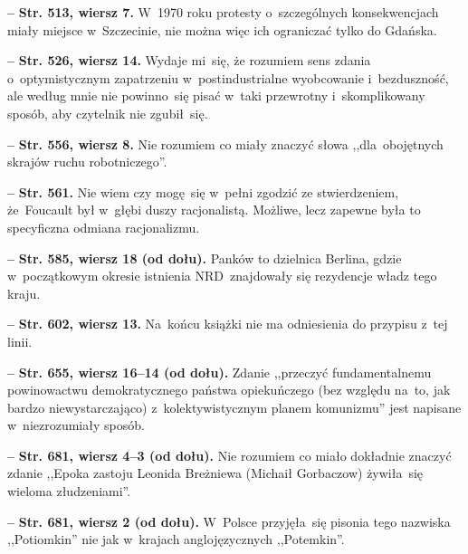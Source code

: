 \documentclass[a4paper,11pt]{article}  %
\newcommand{\spaceFour}{0.5em}
\newcommand{\tb}{\textbf}
\newcommand{\noi}{\noindent}
\newcommand{\start}{\noi \tb{--} {}}
\newcommand{\Str}[1]{\tb{Str. #1.}}
\newcommand{\StrWg}[2]{\tb{Str. #1, wiersz #2.}}
\newcommand{\StrWd}[2]{\tb{Str. #1, wiersz #2 (od dołu).}}
\begin{document}
\vspace{\spaceFour}


\start \StrWg{513}{7} W~1970 roku protesty o~szczególnych
konsekwencjach miały miejsce w~Szczecinie, nie można więc ich
ograniczać tylko do Gdańska.

\vspace{\spaceFour}


\start \StrWg{526}{14} Wydaje mi~się, że rozumiem sens zdania
o~optymistycznym zapatrzeniu w~postindustrialne wyobcowanie
i~bezduszność, ale według mnie nie powinno~się pisać w~taki przewrotny
i~skomplikowany sposób, aby czytelnik nie zgubił~się.

\vspace{\spaceFour}


\start \StrWg{556}{8} Nie rozumiem co miały znaczyć słowa
,,dla~obojętnych skrajów ruchu robotniczego''.

\vspace{\spaceFour}


\start \Str{561} Nie wiem czy mogę~się w~pełni zgodzić ze
stwierdzeniem, że~Foucault był w~głębi duszy racjonalistą. Możliwe,
lecz zapewne była to specyficzna odmiana racjonalizmu.

\vspace{\spaceFour}


\start \StrWd{585}{18} Panków to dzielnica Berlina, gdzie
w~początkowym okresie istnienia NRD~znajdowały się rezydencje władz
tego kraju.

\vspace{\spaceFour}


\start \StrWg{602}{13} Na~końcu książki nie ma odniesienia do przypisu
z~tej linii.

\vspace{\spaceFour}


\start \StrWd{655}{16--14} Zdanie ,,przeczyć fundamentalnemu
powinowactwu demokratycznego państwa opiekuńczego (bez względu na~to,
jak bardzo niewystarczająco) z~kolektywistycznym planem komunizmu''
jest napisane w~niezrozumiały sposób.

\vspace{\spaceFour}


\start \StrWd{681}{4--3} Nie rozumiem co miało dokładnie znaczyć
zdanie ,,Epoka zastoju Leonida Breżniewa (Michaił Gorbaczow)
żywiła~się wieloma złudzeniami''.

\vspace{\spaceFour}

\start \StrWd{681}{2} W~Polsce przyjęła~się pisonia tego nazwiska
,,Potiomkin'' nie jak w~krajach anglojęzycznych ,,Potemkin''.
\end{document}
